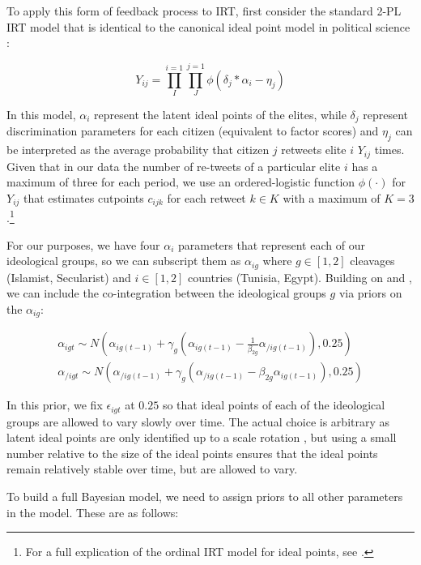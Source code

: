 \documentclass[12pt]{article}
\begin{document}
To apply this form of feedback process to IRT, first consider the standard 2-PL IRT model that is identical to the canonical ideal point model in political science \parencite{jackman2004}:

\begin{equation}
Y_{ij} = \prod^{i=1}_I \prod^{j=1}_J \phi(\delta_j * \alpha_i - \eta_j)
\end{equation}

In this model, $\alpha_i$ represent the latent ideal points of the elites, while $\delta_j$ represent discrimination parameters for each citizen (equivalent to factor scores) and $\eta_j$ can be interpreted as the average probability that citizen $j$ retweets elite $i$ $Y_{ij}$ times. Given that in our data the number of re-tweets of a particular elite $i$ has a maximum of three for each period, we use an ordered-logistic function $\phi(\cdot)$ for $Y_{ij}$ that estimates cutpoints $c_{ijk}$ for each retweet $k \in K$ with a maximum of $K=3$.\footnote{For a full explication of the ordinal IRT model for ideal points, see \textcite{kubinec2017}.}

For our purposes, we have four $\alpha_i$ parameters that represent each of our ideological groups, so we can subscript them as $\alpha_{ig}$ where $g \in [1,2]$ cleavages (Islamist, Secularist) and $i \in [1,2]$ countries (Tunisia, Egypt).  Building on \textcite{quinn2002} and \textcite{kropko2013}, we can include the co-integration between the ideological groups $g$ via priors on the $\alpha_{ig}$:

\begin{align*}
\alpha_{igt}  \sim N(\alpha_{ig(t-1)} + \gamma_g (\alpha_{ig(t-1)} - \frac{1}{\beta_{2g}}  \alpha_{/ig(t-1)}),0.25)\\
\alpha_{/igt}  \sim N(\alpha_{/ig(t-1)} + \gamma_g (\alpha_{/ig(t-1)} - \beta_{2g}  \alpha_{ig(t-1)}),0.25)
\end{align*}

In this prior, we fix $\epsilon_{igt}$ at $0.25$ so that ideal points of each of the ideological groups are allowed to vary slowly over time. The actual choice is arbitrary as latent ideal points are only identified up to a scale rotation \parencite{gelman2005}, but using a small number relative to the size of the ideal points ensures that the ideal points remain relatively stable over time, but are allowed to vary.

To build a full Bayesian model, we need to assign priors to all other parameters in the model. These are as follows:
\end{document}
